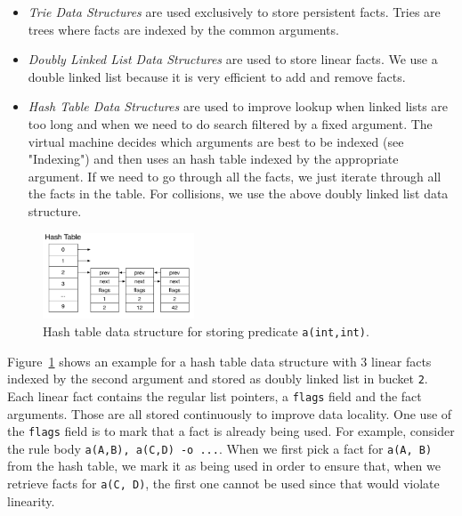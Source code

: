 \begin{itemize}
   \item \emph{Trie Data Structures} are used exclusively to store persistent facts.
   Tries are trees where facts are indexed by the common arguments.
      
   \item \emph{Doubly Linked List Data Structures} are used to store linear facts.
   We use a double linked list because it is very efficient to add and remove facts.
   
   \item \emph{Hash Table Data Structures} are used to improve lookup when linked lists are too long and when we need to do search filtered by a fixed argument. The virtual machine decides which arguments are best to be indexed
   (see "Indexing") and then
   uses an hash table indexed by the appropriate argument. If we need to go through all the facts, we just iterate through all the facts in the table. For collisions, we use the above doubly linked list data structure.
\end{itemize}

\begin{figure}[]
   \centering
   \includegraphics[width=0.40\textwidth]{hash_table.pdf}
   \caption{\small{Hash table data structure for storing predicate \texttt{a(int,int)}.}}
   \label{fig:hash_table}
\end{figure}

Figure~\ref{fig:hash_table} shows an example for a hash table data structure
with 3 linear facts indexed by the second argument and stored as doubly linked list
in bucket \texttt{2}. Each linear fact contains the regular list pointers, a \texttt{flags} field
and the fact arguments. Those are all stored continuously to improve data
locality. One use of the \texttt{flags} field is to mark that a fact is already being used. For example,
consider the rule body \texttt{a(A,B), a(C,D) -o ...}. When we first pick a fact for \texttt{a(A, B)} from the hash table,
we mark it as being used in order to ensure that, when we retrieve facts for \texttt{a(C, D)}, the first one
cannot be used since that would violate linearity.

